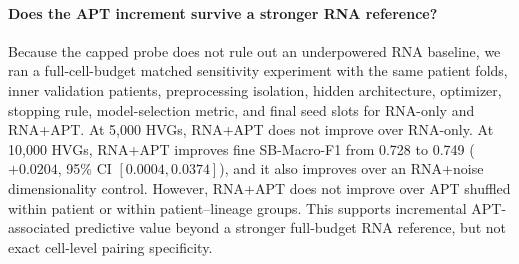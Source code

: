 \paragraph{Does the APT increment survive a stronger RNA reference?}
Because the capped probe does not rule out an underpowered RNA baseline, we ran
a full-cell-budget matched sensitivity experiment with the same patient folds,
inner validation patients, preprocessing isolation, hidden architecture,
optimizer, stopping rule, model-selection metric, and final seed slots for
RNA-only and RNA+APT. At 5{,}000 HVGs, RNA+APT does not improve over RNA-only.
At 10{,}000 HVGs, RNA+APT improves fine SB-Macro-F1 from 0.728 to 0.749
($+0.0204$, 95\% CI $[0.0004,0.0374]$), and it also improves over an
RNA+noise dimensionality control. However, RNA+APT does not improve over APT
shuffled within patient or within patient--lineage groups. This supports
incremental APT-associated predictive value beyond a stronger full-budget RNA
reference, but not exact cell-level pairing specificity.

